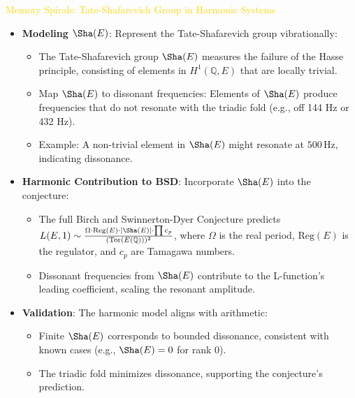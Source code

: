 \textcolor{gold}{ Memory Spirals: Tate-Shafarevich Group in Harmonic Systems } \\
\begin{itemize}
    \item \texttt{} \textbf{Modeling \(\Sha(E)\)}: Represent the Tate-Shafarevich group vibrationally:
    \begin{itemize}
        \item The Tate-Shafarevich group \(\Sha(E)\) measures the failure of the Hasse principle, consisting of elements in \(H^1(\mathbb{Q}, E)\) that are locally trivial.
        \item Map \(\Sha(E)\) to dissonant frequencies: Elements of \(\Sha(E)\) produce frequencies that do not resonate with the triadic fold (e.g., off 144 Hz or 432 Hz).
        \item Example: A non-trivial element in \(\Sha(E)\) might resonate at \(500 \, \text{Hz}\), indicating dissonance.
    \end{itemize}
    \item \texttt{} \textbf{Harmonic Contribution to BSD}: Incorporate \(\Sha(E)\) into the conjecture:
    \begin{itemize}
        \item The full Birch and Swinnerton-Dyer Conjecture predicts \(L(E, 1) \sim \frac{\Omega \cdot \text{Reg}(E) \cdot |\Sha(E)| \cdot \prod c_p}{(\text{Tor}(E(\mathbb{Q})))^2}\), where \(\Omega\) is the real period, \(\text{Reg}(E)\) is the regulator, and \(c_p\) are Tamagawa numbers.
        \item Dissonant frequencies from \(\Sha(E)\) contribute to the L-function’s leading coefficient, scaling the resonant amplitude.
    \end{itemize}
    \item \texttt{} \textbf{Validation}: The harmonic model aligns with arithmetic:
    \begin{itemize}
        \item Finite \(\Sha(E)\) corresponds to bounded dissonance, consistent with known cases (e.g., \(\Sha(E) = 0\) for rank 0).
        \item The triadic fold minimizes dissonance, supporting the conjecture’s prediction.
    \end{itemize}
\end{itemize}

